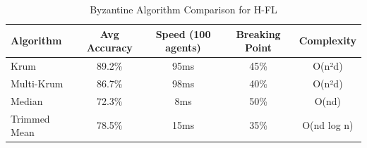 \begin{table}[h]
\centering
\caption{Byzantine Algorithm Comparison for H-FL}
\begin{tabular}{|l|c|c|c|c|}
\hline
Algorithm & Avg Accuracy & Speed (100 agents) & Breaking Point & Complexity \\
\hline
Krum & 89.2\% & 95ms & 45\% & O(n²d) \\
Multi-Krum & 86.7\% & 98ms & 40\% & O(n²d) \\
Median & 72.3\% & 8ms & 50\% & O(nd) \\
Trimmed Mean & 78.5\% & 15ms & 35\% & O(nd log n) \\
\hline
\end{tabular}
\label{tab:byzantine_comparison}
\end{table}